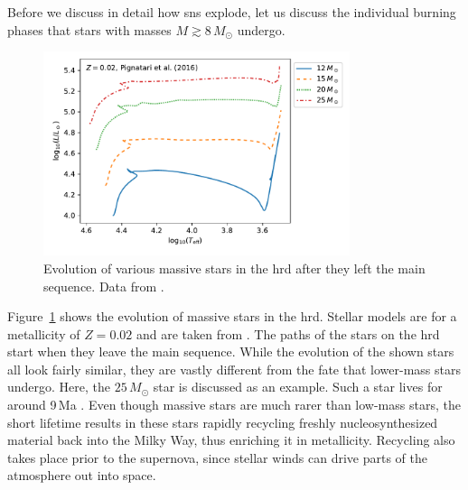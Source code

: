 Before we discuss in detail how \acp{sn} explode, let us discuss the individual burning phases that stars with masses $M \gtrsim 8\,M_\odot$ undergo.
\begin{figure}[tb]
    \centering
    \includegraphics[width=0.8\textwidth]{graphics/massive_stars/hrd_massive_stars}
    \caption{Evolution of various massive stars in the \ac{hrd} after they left the main sequence. Data from \citet{pignatari16}.}
    \label{fig:massive_stars:hrds_pignatari_nugrid_set1.2}
\end{figure}
Figure~\ref{fig:massive_stars:hrds_pignatari_nugrid_set1.2} shows the evolution of massive stars in the \ac{hrd}. Stellar models are for a metallicity of $Z=0.02$ and are taken from \citet{pignatari16}. The paths of the stars on the \ac{hrd} start when they leave the main sequence. While the evolution of the shown stars all look fairly similar, they are vastly different from the fate that lower-mass stars undergo. Here, the $25\,M_\odot$ star is discussed as an example. Such a star lives for around 9\,Ma \citep{meynet03}. Even though massive stars are much rarer than low-mass stars, the short lifetime results in these stars rapidly recycling freshly nucleosynthesized material back into the Milky Way, thus enriching it in metallicity. Recycling also takes place prior to the supernova, since stellar winds can drive parts of the atmosphere out into space. 

\begin{table}[b]\label{codebox:nugrid}
\end{table}

